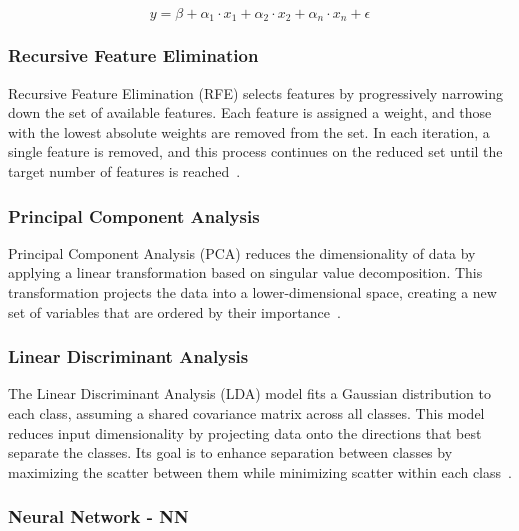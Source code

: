 \begin{equation}
  y = \beta + \alpha_1 \cdot x_1 + \alpha_2 \cdot x_2 + \alpha_n \cdot x_n + \epsilon
  \label{eq:regAnalEQGeneral}
\end{equation}


\subsubsection{Recursive Feature Elimination}
\label{sssec:recursive_feature_elimination}

Recursive Feature Elimination (RFE) selects features by progressively narrowing down the set of available features. Each feature is assigned a weight, and those with the lowest absolute 
weights are removed from the set. In each iteration, a single feature is removed, and this process continues on the reduced set until the target number of features is reached~\cite{porto}.


\subsubsection{Principal Component Analysis}
\label{sssec:principal_component_analysis}

Principal Component Analysis (PCA) reduces the dimensionality of data by applying a linear transformation based on singular value decomposition. This transformation projects the data 
into a lower-dimensional space, creating a new set of variables that are ordered by their importance~\cite{porto}.


\subsubsection{Linear Discriminant Analysis}
\label{sssec:linear_discriminant_analysis}

The Linear Discriminant Analysis (LDA) model fits a Gaussian distribution to each class, assuming a shared covariance matrix across all classes. This model reduces input dimensionality 
by projecting data onto the directions that best separate the classes. Its goal is to enhance separation between classes by maximizing the scatter between them while minimizing scatter 
within each class~\cite{porto, ComprehensiveStudyOnEMG}.


\subsubsection{Neural Network - NN}
\label{sssec:neural_network}

